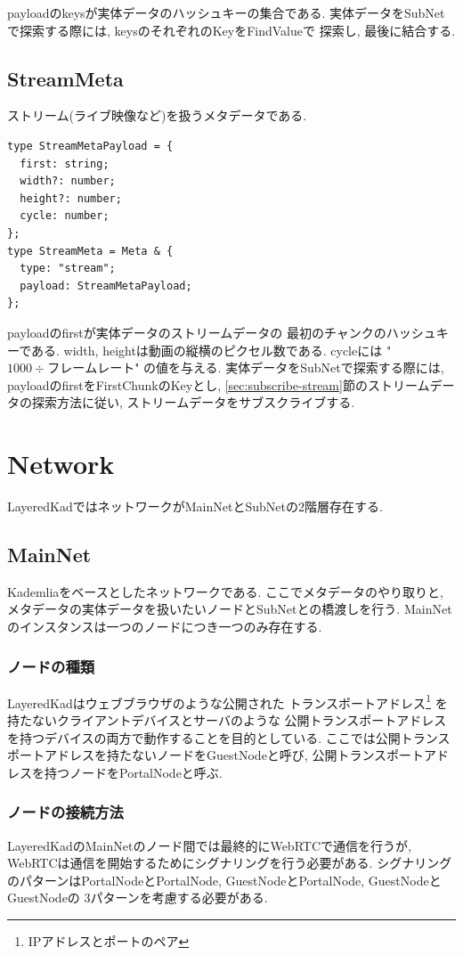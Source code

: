 \documentclass[sotsuron]{jcsie}
\begin{document}
payloadのkeysが実体データのハッシュキーの集合である.
実体データをSubNetで探索する際には, keysのそれぞれのKeyをFindValueで
探索し, 最後に結合する.

\subsection{StreamMeta}
ストリーム(ライブ映像など)を扱うメタデータである.
\\
\begin{lstlisting}
type StreamMetaPayload = {
  first: string;
  width?: number;
  height?: number;
  cycle: number;
};	
type StreamMeta = Meta & {
  type: "stream";
  payload: StreamMetaPayload;
};  
\end{lstlisting}

payloadのfirstが実体データのストリームデータの
最初のチャンクのハッシュキーである.
width, heightは動画の縦横のピクセル数である.
cycleには "$ 1000 \div フレームレート $" の値を与える.
実体データをSubNetで探索する際には, payloadのfirstをFirstChunkのKeyとし, 
\ref{sec:subscribe-stream}節のストリームデータの探索方法に従い, 
ストリームデータをサブスクライブする.

\section{Network}
LayeredKadではネットワークがMainNetとSubNetの2階層存在する.

\subsection{MainNet}
Kademliaをベースとしたネットワークである.
ここでメタデータのやり取りと, 
メタデータの実体データを扱いたいノードとSubNetとの橋渡しを行う.
MainNetのインスタンスは一つのノードにつき一つのみ存在する.

\subsubsection{ノードの種類}
LayeredKadはウェブブラウザのような公開された
トランスポートアドレス\footnote{IPアドレスとポートのペア}
を持たないクライアントデバイスとサーバのような
公開トランスポートアドレスを持つデバイスの両方で動作することを目的としている.
ここでは公開トランスポートアドレスを持たないノードをGuestNodeと呼び, 
公開トランスポートアドレスを持つノードをPortalNodeと呼ぶ.

\subsubsection{ノードの接続方法}
LayeredKadのMainNetのノード間では最終的にWebRTCで通信を行うが, 
WebRTCは通信を開始するためにシグナリングを行う必要がある.
シグナリングのパターンはPortalNodeとPortalNode, 
GuestNodeとPortalNode, GuestNodeとGuestNodeの
3パターンを考慮する必要がある.
\end{document}
